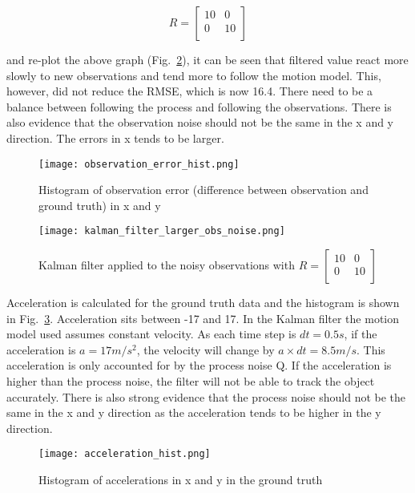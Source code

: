 \documentclass{report}
\begin{document}
\[R = \begin{bmatrix} 
    10 & 0 \\
    0 & 10 \\
\end{bmatrix}\]

and re-plot the above graph (Fig.~\ref{fig:kalman_filter_larger_obs_noise}), it can be seen that filtered value react more slowly to new observations and tend more to follow the motion model. This, however, did not reduce the RMSE, which is now 16.4. There need to be a balance between following the process and following the observations. There is also evidence that the observation noise should not be the same in the x and y direction. The errors in x tends to be larger.


\begin{figure}[ht]
    \centering
    \texttt{[image: observation\_error\_hist.png]}
    \caption{Histogram of observation error (difference between observation and ground truth) in x and y}
    \label{fig:observation_error_hist}
\end{figure}

\begin{figure}[ht]
    \centering
    \texttt{[image: kalman\_filter\_larger\_obs\_noise.png]}
    \caption{Kalman filter applied to the noisy observations with \(R = \begin{bmatrix} 
        10 & 0 \\
        0 & 10 \\
    \end{bmatrix}\)}
    \label{fig:kalman_filter_larger_obs_noise}
\end{figure}

Acceleration is calculated for the ground truth data and the histogram is shown in Fig.~\ref{fig:acceleration_hist}. Acceleration sits between -17 and 17. In the Kalman filter the motion model used assumes constant velocity. As each time step is \(dt=0.5s\), if the acceleration is \(a = 17 m/s^2\), the velocity will change by \(a \times dt = 8.5m/s\). This acceleration is only accounted for by the process noise Q. If the acceleration is higher than the process noise, the filter will not be able to track the object accurately. There is also strong evidence that the process noise should not be the same in the x and y direction as the acceleration tends to be higher in the y direction.

\begin{figure}[ht]
    \centering
    \texttt{[image: acceleration\_hist.png]}
    \caption{Histogram of accelerations in x and y in the ground truth}
    \label{fig:acceleration_hist}
\end{figure}
\end{document}
